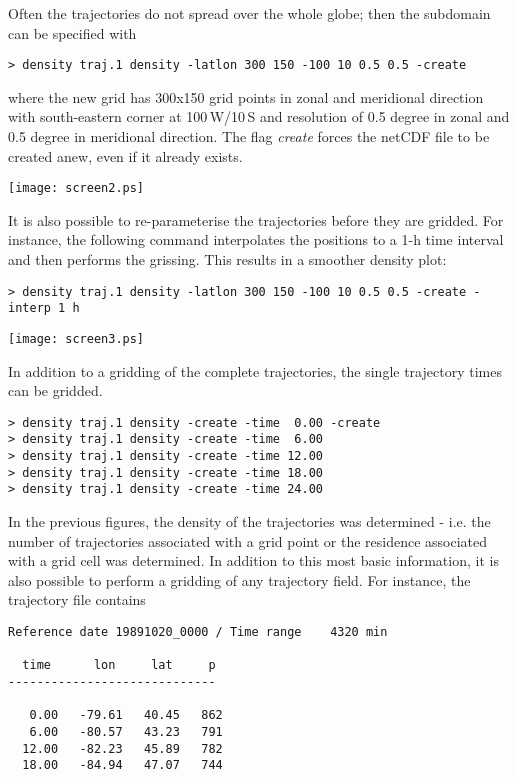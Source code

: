 \documentclass[a4paper,10pt]{article}
\begin{document}
\noindent
Often the trajectories do not spread over the whole globe; then the subdomain can be specified with
\begin{verbatim}
> density traj.1 density -latlon 300 150 -100 10 0.5 0.5 -create
\end{verbatim}
where the new grid has 300x150 grid points in zonal and meridional direction with south-eastern corner at 100\,W/10\,S and resolution of 0.5 degree in zonal and 0.5 degree in meridional direction. The flag {\em create} forces the netCDF file to be created anew, even if it already exists.

\texttt{[image: screen2.ps]}

\noindent
It is also possible to re-parameterise the trajectories before they are gridded. For instance, the following command interpolates the positions to a 1-h time interval and then performs the grissing. This results in a smoother density plot:
\begin{verbatim}
> density traj.1 density -latlon 300 150 -100 10 0.5 0.5 -create -interp 1 h
\end{verbatim}

\texttt{[image: screen3.ps]}

\noindent
In addition to a gridding of the complete trajectories, the single trajectory times can be gridded. 
\begin{verbatim}
> density traj.1 density -create -time  0.00 -create
> density traj.1 density -create -time  6.00 
> density traj.1 density -create -time 12.00 
> density traj.1 density -create -time 18.00 
> density traj.1 density -create -time 24.00 
\end{verbatim}

\noindent
In the previous figures, the density of the trajectories was determined - i.e. the number of trajectories associated with a grid point or the residence associated with a grid cell was determined. In addition to this most basic information, it is also possible to perform a gridding of any trajectory field. For instance, the trajectory file contains

\begin{verbatim}
Reference date 19891020_0000 / Time range    4320 min

  time      lon     lat     p
-----------------------------

   0.00   -79.61   40.45   862
   6.00   -80.57   43.23   791
  12.00   -82.23   45.89   782
  18.00   -84.94   47.07   744
\end{verbatim}
\end{document}
